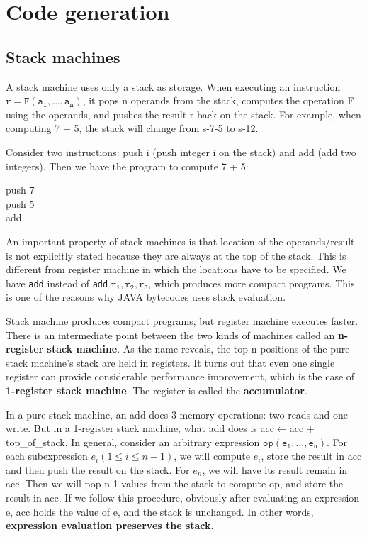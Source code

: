 \ifx\PREAMBLE\undefined


\fi
\chapter{Code generation}
\section{Stack machines}
A stack machine uses only a stack as storage. When executing an instruction $\mathtt{r = F(a_1,\dots,a_n)}$, it pops n operands from the stack, computes the operation F using the operands, and pushes the result r back on the stack. For example, when computing 7 + 5, the stack will change from s-7-5 to s-12. 

Consider two instructions: push i (push integer i on the stack) and add (add two integers). Then we have the program to compute 7 + 5:
\begin{center}
push 7\\push 5\\add
\end{center}
An important property of stack machines is that location of the operands/result is not explicitly stated because they are always at the top of the stack. This is different from register machine in which the locations have to be specified. We have \texttt{add} instead of \texttt{add} $\mathtt{r_1, r_2, r_3}$, which produces more compact programs. This is one of the reasons why JAVA bytecodes uses stack evaluation.

Stack machine produces compact programs, but register machine executes faster. There is an intermediate point between the two kinds of machines called an \textbf{n-register stack machine}. As the name reveals, the top n positions of the pure stack machine's stack are held in registers. It turns out that even one single register can provide considerable performance improvement, which is the case of \textbf{1-register stack machine}. The register is called the \textbf{accumulator}. 

In a pure stack machine, an add does 3 memory operations: two reads and one write. But in a 1-register stack machine, what add does is acc$\leftarrow$acc + top\_of\_stack. In general, consider an arbitrary expression $\mathtt{op(e_1,\dots,e_n)}$. For each subexpression $e_i(1\leq i\leq n-1)$, we will compute $e_i$, store the result in acc and then push the result on the stack. For $e_n$, we will have its result remain in acc. Then we will pop n-1 values from the stack to compute op, and store the result in acc. If we follow this procedure, obviously after evaluating an expression e, acc holds the value of e, and the stack is unchanged. In other words, \textbf{expression evaluation preserves the stack.}

